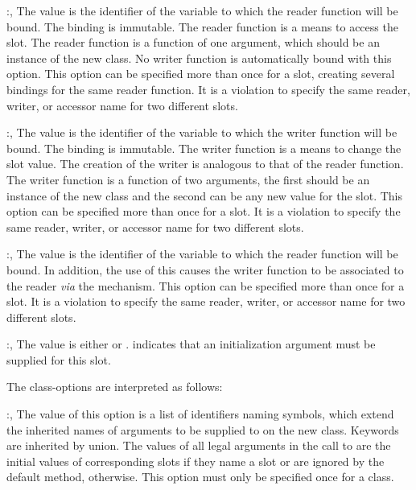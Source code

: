 \begin{optDefinition}
\begin{options}
    \item[\keyworddef{reader}:, \scref{identifier}]%
    The value is the identifier of the variable to which the reader function
    will be bound.  The binding is immutable.  The reader function is a means to
    access the slot.  The reader function is a function of one argument, which
    should be an instance of the new class.  No writer function is automatically
    bound with this option.  This option can be specified more than once for a
    slot, creating several bindings for the same reader function. It is a
    violation to specify the same reader, writer, or accessor name for two
    different slots.

    \item[\keyworddef{writer}:, \scref{identifier}]%
    The value is the identifier of the variable to which the writer function
    will be bound.  The binding is immutable.  The writer function is a means to
    change the slot value.  The creation of the writer is analogous to that of
    the reader function. The writer function is a function of two arguments, the
    first should be an instance of the new class and the second can be any new
    value for the slot.  This option can be specified more than once for a slot.
    It is a violation to specify the same reader, writer, or accessor name
    for two different slots.

    \item[\keyworddef{accessor}:, \scref{identifier}]%
    The value is the identifier of the variable to which the reader function
    will be bound. In addition, the use of this  causes the
    writer function to be associated to the reader {\em via\/} the
     mechanism. This option can be specified more than once
    for a slot. It is a violation to specify the same reader, writer, or
    accessor name for two different slots.

    \item[\keyworddef{required?}:, \scref{boolean}]%
    The value is either \true{} or \nil{}. \true{} indicates that an
    initialization argument must be supplied for this slot.
\end{options}
%
The class-options are interpreted as follows:
%
\begin{options}
    \item[\keyworddef{keywords}:, \sc{( \scseqref{identifier} )}]%
    The value of this option is a list of identifiers naming symbols, which
    extend the inherited names of arguments to be supplied to 
    on the new class.  Keywords are inherited by union. The values of all legal
    arguments in the call to  are the initial values of
    corresponding slots if they name a slot  or are ignored by
    the default  method, otherwise. This option
    must only be specified once for a class.


\end{options}
\end{optDefinition}
